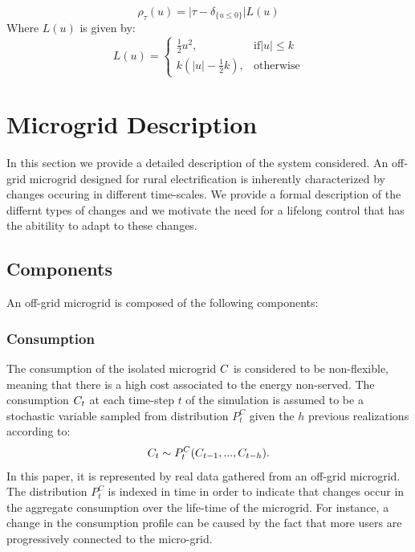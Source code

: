 \documentclass{article}
\begin{document}
		\begin{equation}
			\rho_{\tau}(u) = \lvert \tau - \delta_{\{u\leq0\}}\rvert L(u)
		\end{equation}
	Where $L(u)$ is given by:
		\begin{equation}
			L(u) = 
			\begin{cases}
				\frac{1}{2} u^2,& \text{if} \lvert u \rvert \leq k \\
				k(\lvert u\rvert - \frac{1}{2}k),& \text{otherwise}
			\end{cases}
		\end{equation}

\section{Microgrid Description}\label{sec: Simulator}
    \label{sec:gym}
    In this section we provide a detailed description of the system considered. An off-grid microgrid designed for rural electrification is inherently characterized by changes occuring in different time-scales. We provide a formal description of the differnt types of changes and we motivate the need for a lifelong control that has the abitility to adapt to these changes.
    
    
\subsection{Components}

An off-grid microgrid is composed of the following components:
 
\subsubsection{Consumption} 
    
    The consumption of the isolated microgrid $C$ is considered to be non-flexible, meaning that there is a high cost associated to the energy non-served. The consumption $C_{t}$ at each time-step $t$ of the simulation is assumed to be a stochastic variable sampled from distribution $P^{C}_{t}$ given the $h$ previous realizations according to:
    \begin{gather}
    C_{t} \sim P^{C}_{t}( C_{t-1}, ...,C_{t-h} ).\label{eqn: load}
    \end{gather}
    In this paper, it is represented by real data gathered from an off-grid microgrid. The distribution $P^{C}_{t}$ is indexed in time in order to indicate that changes occur in the aggregate consumption over the life-time of the microgrid. For instance, a change in the consumption profile can be caused by the fact that more users are progressively connected to the micro-grid.
\end{document}
